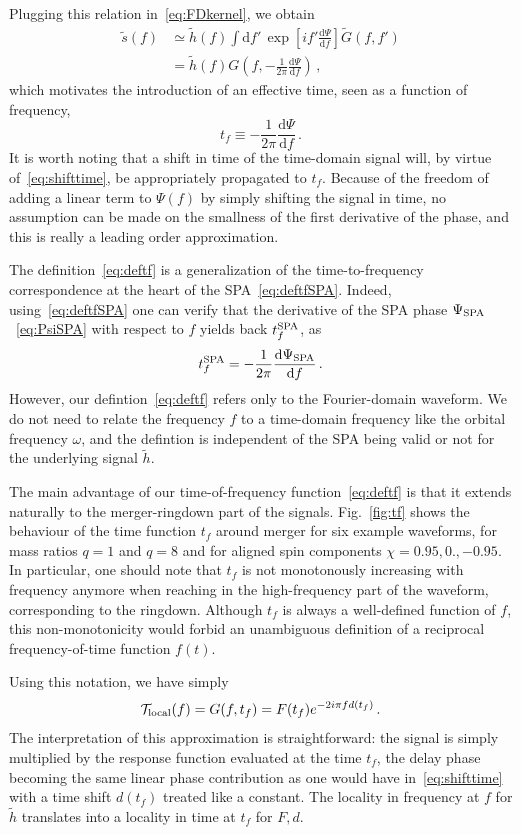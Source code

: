 \documentclass[aps,showpacs,twocolumn,
prd,superscriptaddress,nofootinbib]{revtex4-1}
\newcommand{\be}{\begin{equation}}
\newcommand{\ee}{\end{equation}}
\newcommand\ud{{\mathrm{d}}}
\newcommand\calT{{\mathcal{T}}}
\newcommand{\nn}{\nonumber}
\newcommand{\tf}{t_{f}}
\newcommand{\tfSPA}{t_{f}^{\rm SPA}}
\begin{document}
Plugging this relation in~\eqref{eq:FDkernel}, we obtain
\begin{align}
	\tilde{s}(f) &\simeq \tilde{h}(f) \int \ud f' \, \exp\left[ i f' \frac{\ud \Psi}{\ud f} \right] \tilde{G}(f,f') \nn\\
	&= \tilde{h}(f) G\left( f, -\frac{1}{2\pi} \frac{\ud \Psi}{\ud f} \right) \,,
\end{align}
which motivates the introduction of an effective time, seen as a function of frequency,
\be\label{eq:deftf}
	\tf \equiv -\frac{1}{2\pi} \frac{\ud \Psi}{\ud f} \,.
\ee
It is worth noting that a shift in time of the time-domain signal will, by virtue of~\eqref{eq:shifttime}, be appropriately propagated to $t_{f}$. Because of the freedom of adding a linear term to $\Psi(f)$ by simply shifting the signal in time, no assumption can be made on the smallness of the first derivative of the phase, and this is really a leading order approximation.

The definition~\eqref{eq:deftf} is a generalization of the time-to-frequency correspondence at the heart of the SPA~\eqref{eq:deftfSPA}. Indeed, using~\eqref{eq:deftfSPA} one can verify that the derivative of the SPA phase $\Psi_{\rm SPA}$~\eqref{eq:PsiSPA} with respect to $f$ yields back $\tfSPA$, as
\be
	\tfSPA = -\frac{1}{2\pi} \frac{\ud \Psi_{\rm SPA}}{\ud f} \,.
\ee
However, our defintion~\eqref{eq:deftf} refers only to the Fourier-domain waveform. We do not need to relate the frequency $f$ to a time-domain frequency like the orbital frequency $\omega$, and the defintion is independent of the SPA being valid or not for the underlying signal $\tilde{h}$.

The main advantage of our time-of-frequency function~\eqref{eq:deftf} is that it extends naturally to the merger-ringdown part of the signals. Fig.~\ref{fig:tf} shows the behaviour of the time function $\tf$ around merger for six example waveforms, for mass ratios $q=1$ and $q=8$ and for aligned spin components $\chi=0.95,0.,-0.95$. In particular, one should note that $\tf$ is not monotonously increasing with frequency anymore when reaching in the high-frequency part of the waveform, corresponding to the ringdown. Although $t_{f}$ is always a well-defined function of $f$, this non-monotonicity would forbid an unambiguous definition of a reciprocal frequency-of-time function $f(t)$.

Using this notation, we have simply
\be\label{eq:transferlocal}
	\calT_{\rm local}(f) = G(f, \tf) = F(t_{f}) e^{-2i\pi f d(t_{f})}\,.
\ee
The interpretation of this approximation is straightforward: the signal is simply multiplied by the response function evaluated at the time $\tf$, the delay phase becoming the same linear phase contribution as one would have in~\eqref{eq:shifttime} with a time shift $d(t_{f})$ treated like a constant. The locality in frequency at $f$ for $\tilde{h}$ translates into a locality in time at $t_{f}$ for $F,d$.
\end{document}
